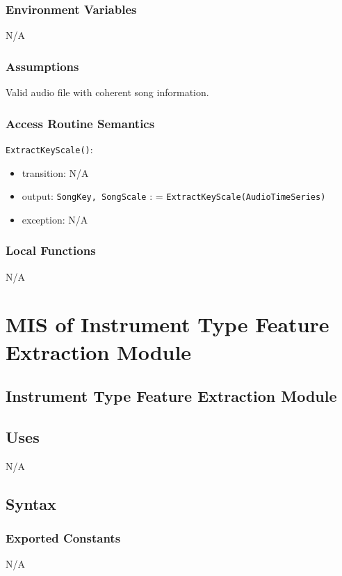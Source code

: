 \documentclass[12pt, titlepage]{article}
\begin{document}
\subsubsection{Environment Variables}
N/A

\subsubsection{Assumptions}
Valid audio file with coherent song information.

\subsubsection{Access Routine Semantics}

\noindent \texttt{ExtractKeyScale()}:
\begin{itemize}
\item transition: N/A
\item output: \texttt{Song\textunderscore Key, Song\textunderscore Scale} : = \texttt{ExtractKeyScale(Audio\textunderscore Time\textunderscore Series)}
\item exception: N/A
\end{itemize}

\subsubsection{Local Functions}
N/A


\section{MIS of Instrument Type Feature Extraction Module} 

\subsection{Instrument Type Feature Extraction Module}

\subsection{Uses}
N/A

\subsection{Syntax}

\subsubsection{Exported Constants}
N/A
\end{document}
